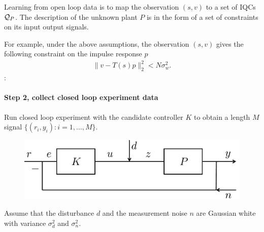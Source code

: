 \documentclass[11pt, onecolumn]{article}
\newcommand{\rb}[1]{{\color{red}{Ross: #1}}}
\begin{document}
\begin{definition}
  Learning from open loop data is to map the observation $(s,v)$ to a set of IQCs $\mathcal Q_P$.  The
  description of the unknown plant $P$ is in the form of a set of constraints on its input output
  signals.


  For example, under the above assumptions, the observation $(s,v)$ gives the following constraint
  on the impulse response $p$
  \begin{align*}
    \|v - T(s) p \|_2^2 < N \sigma_w^2.
  \end{align*}
  \rb{Doesn't this only hold in expectation/WHP? The constraint is fine, but it
    doesn't ``follow from the assumption''.}:


\end{definition}

\paragraph{Step 2,  collect closed  loop experiment data}
Run closed loop experiment with the candidate controller $K$ to obtain a length $M$ signal
$\{(r_i,y_i) : i=1,\dots, M\}$.
\begin{figure}[!ht]
  \centering
  \includegraphics[width=.5\linewidth]{sys2.pdf}
\end{figure}

\begin{assumption}
  Assume that the disturbance $d$ and the measurement noise $n$ are Gaussian white with variance
  $\sigma_d^2$ and $\sigma_n^2$.
\end{assumption}
\end{document}

